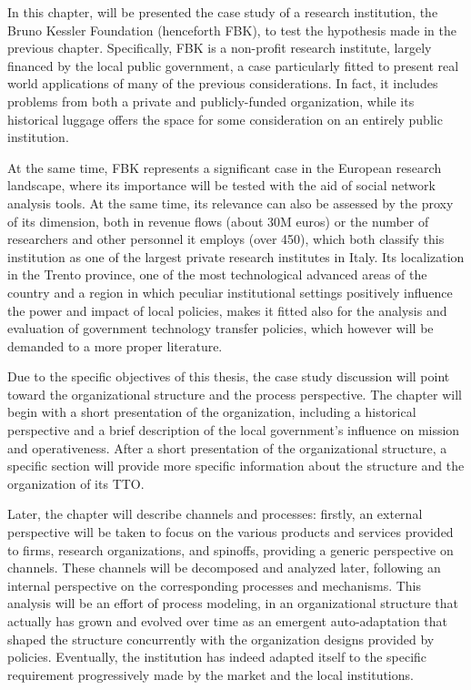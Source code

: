 

\label{Chapter7}

In this chapter, will be presented the case study of a research institution, the Bruno Kessler Foundation (henceforth FBK), to test the hypothesis made in the previous chapter. Specifically, FBK is a non-profit research institute, largely financed by the local public government, a case particularly fitted to present real world applications of many of the previous considerations. In fact, it includes problems from both a private and publicly-funded organization, while its historical luggage offers the space for some consideration on an entirely public institution. 

At the same time, FBK represents a significant case in the European research landscape, where its importance will be tested with the aid of social network analysis tools. At the same time, its relevance can also be assessed by the proxy of its dimension, both in revenue flows (about 30M euros) or the number of researchers and other personnel it employs (over 450), which both classify this institution as one of the largest private research institutes in Italy. Its localization in the Trento province, one of the most technological advanced areas of the country and a region in which peculiar institutional settings positively influence the power and impact of local policies, makes it fitted also for the analysis and evaluation of government technology transfer policies, which however will be demanded to a more proper literature.

Due to the specific objectives of this thesis, the case study discussion will point toward the organizational structure and the process perspective. The chapter will begin with a short presentation of the organization, including a historical perspective and a brief description of the local government's influence on mission and operativeness. After a short presentation of the organizational structure, a specific section will provide more specific information about the structure and the organization of its TTO.

Later, the chapter will describe channels and processes: firstly, an external perspective will be taken to focus on the various products and services provided to firms, research organizations, and spinoffs, providing a generic perspective on channels. These channels will be decomposed and analyzed later, following an internal perspective on the corresponding processes and mechanisms. This analysis will be an effort of process modeling, in an organizational structure that actually has grown and evolved over time as an emergent auto-adaptation that shaped the structure concurrently with the organization designs provided by policies. Eventually, the institution has indeed adapted itself to the specific requirement progressively made by the market and the local institutions. 

